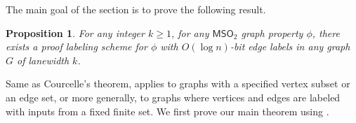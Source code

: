 \documentclass[11pt]{article}
\newtheorem{proposition}[lemma]{Proposition}
\theoremstyle{definition}
\theoremstyle{remark}
\newcommand{\MSO}{\mathsf{MSO}_2}
\begin{document}
The main goal of the section is to prove the following result.

\begin{proposition}\label{prop:certification_algo}
For any integer $k \geq 1$, for any $\MSO$ graph property $\phi$, there exists a proof labeling scheme for $\phi$ with $O(\log n)$-bit edge labels in any graph $G$ of lanewidth $k$.
\end{proposition}


Same as Courcelle's theorem,  applies to graphs with a specified vertex subset or an edge set, or more generally, to graphs where vertices and edges are labeled with inputs from a fixed finite set. We first prove our main theorem using .

\mainthm*
\end{document}

